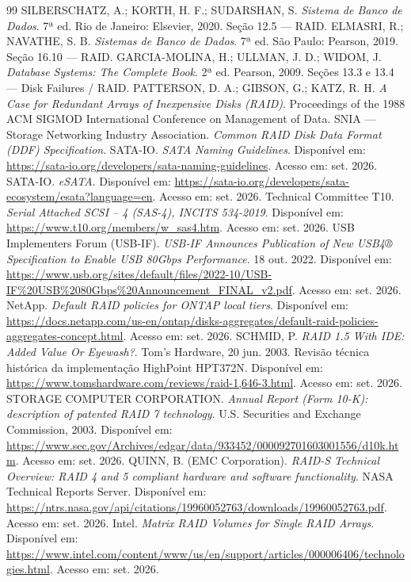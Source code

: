 \documentclass[11pt,a4paper]{article}
\begin{document}
\begin{thebibliography}{99}
 SILBERSCHATZ, A.; KORTH, H. F.; SUDARSHAN, S. \textit{Sistema de Banco de Dados}. 7ª ed. Rio de Janeiro: Elsevier, 2020. Seção 12.5 --- RAID.
 ELMASRI, R.; NAVATHE, S. B. \textit{Sistemas de Banco de Dados}. 7ª ed. São Paulo: Pearson, 2019. Seção 16.10 --- RAID.
 GARCIA-MOLINA, H.; ULLMAN, J. D.; WIDOM, J. \textit{Database Systems: The Complete Book}. 2ª ed. Pearson, 2009. Seções 13.3 e 13.4 --- Disk Failures / RAID.
 PATTERSON, D. A.; GIBSON, G.; KATZ, R. H. \textit{A Case for Redundant Arrays of Inexpensive Disks (RAID)}. Proceedings of the 1988 ACM SIGMOD International Conference on Management of Data.
 SNIA --- Storage Networking Industry Association. \textit{Common RAID Disk Data Format (DDF) Specification}.
 SATA-IO. \textit{SATA Naming Guidelines}. Disponível em: \url{https://sata-io.org/developers/sata-naming-guidelines}. Acesso em: set. 2026.
 SATA-IO. \textit{eSATA}. Disponível em: \url{https://sata-io.org/developers/sata-ecosystem/esata?language=en}. Acesso em: set. 2026.
 Technical Committee T10. \textit{Serial Attached SCSI -- 4 (SAS-4), INCITS 534-2019}. Disponível em: \url{https://www.t10.org/members/w_sas4.htm}. Acesso em: set. 2026.
 USB Implementers Forum (USB-IF). \textit{USB-IF Announces Publication of New USB4® Specification to Enable USB 80Gbps Performance}. 18 out. 2022. Disponível em: \url{https://www.usb.org/sites/default/files/2022-10/USB-IF%20USB%2080Gbps%20Announcement_FINAL_v2.pdf}. Acesso em: set. 2026.
 NetApp. \textit{Default RAID policies for ONTAP local tiers}. Disponível em: \url{https://docs.netapp.com/us-en/ontap/disks-aggregates/default-raid-policies-aggregates-concept.html}. Acesso em: set. 2026.
 SCHMID, P. \textit{RAID 1.5 With IDE: Added Value Or Eyewash?}. Tom's Hardware, 20 jun. 2003. Revisão técnica histórica da implementação HighPoint HPT372N. Disponível em: \url{https://www.tomshardware.com/reviews/raid-1,646-3.html}. Acesso em: set. 2026.
 STORAGE COMPUTER CORPORATION. \textit{Annual Report (Form 10-K): description of patented RAID 7 technology}. U.S. Securities and Exchange Commission, 2003. Disponível em: \url{https://www.sec.gov/Archives/edgar/data/933452/000092701603001556/d10k.htm}. Acesso em: set. 2026.
 QUINN, B. (EMC Corporation). \textit{RAID-S Technical Overview: RAID 4 and 5 compliant hardware and software functionality}. NASA Technical Reports Server. Disponível em: \url{https://ntrs.nasa.gov/api/citations/19960052763/downloads/19960052763.pdf}. Acesso em: set. 2026.
 Intel. \textit{Matrix RAID Volumes for Single RAID Arrays}. Disponível em: \url{https://www.intel.com/content/www/us/en/support/articles/000006406/technologies.html}. Acesso em: set. 2026.
\end{thebibliography}
\end{document}
